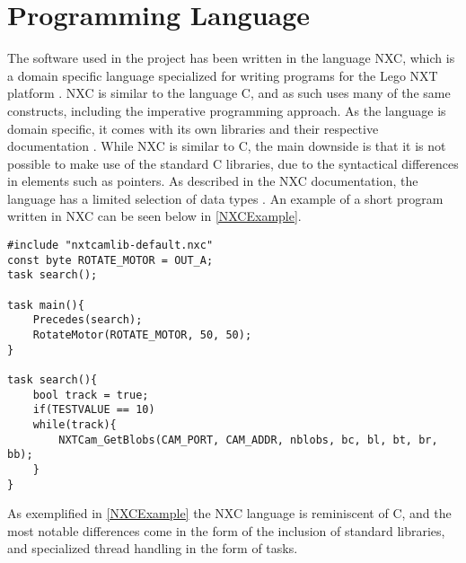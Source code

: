 \section{Programming Language}
The software used in the \name project has been written in the language NXC,
which is a domain specific language specialized for writing programs for the
Lego NXT platform \cite{NXCIntro}. NXC is similar to the language C, and as such
uses many of the same constructs, including the imperative programming approach. As the
language is domain specific, it comes with its own libraries and their
respective documentation \cite{NXCIntro}. While NXC is similar to C, the main
downside is that it is not possible to make use of the standard C libraries, due
to the syntactical differences in elements such as pointers. As described in the NXC documentation,
the language has a limited selection of data types \cite{NXCVariables}. An
example of a short program written in NXC can be seen below in
\autoref{NXCExample}.\nl

\begin{minipage}[H]{\linewidth}
\begin{lstlisting}[caption = Exaple of a program written in the NXC language, label = NXCExample] 
#include "nxtcamlib-default.nxc"
const byte ROTATE_MOTOR = OUT_A;
task search();

task main(){
    Precedes(search);
    RotateMotor(ROTATE_MOTOR, 50, 50);
}

task search(){
	bool track = true;
	if(TESTVALUE == 10)
	while(track){
        NXTCam_GetBlobs(CAM_PORT, CAM_ADDR, nblobs, bc, bl, bt, br, bb);
	}
}
\end{lstlisting}
\end{minipage}

As exemplified in \autoref{NXCExample} the NXC language is reminiscent of C, and
the most notable differences come in the form of the inclusion of standard
libraries, and specialized thread handling in the form of tasks.
